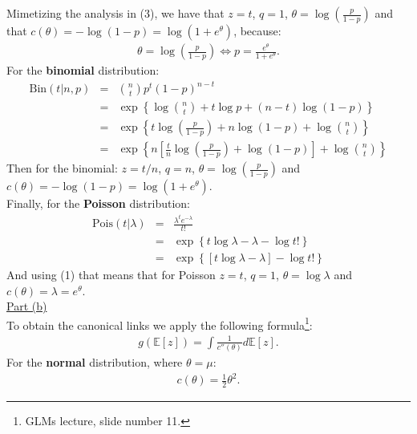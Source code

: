 \documentclass[a4paper, 11pt]{article}
\begin{document}
Mimetizing the analysis in (3), we have that $z=t$, $q=1$, $\theta = \log \left( \frac{p}{1-p} \right)$ and that $c(\theta) = -\log{(1-p)} = \log(1 + e^\theta)$, because:
\begin{eqnarray}
\theta = \log \left( \frac{p}{1-p} \right) \Leftrightarrow p = \frac{e^\theta}{1 + e^\theta}.
\end{eqnarray}
For the \textbf{binomial} distribution:
\begin{eqnarray}
\text{Bin}(t | n,p) &=& {n \choose t} p^t (1-p)^{n-t}   \nonumber \\
&=& \exp \left\{ \log{n \choose t} + t \log p + (n-t) \log{(1-p)} \right\} \nonumber \\
&=& \exp \left\{ t \log \left( \frac{p}{1-p} \right) + n \log{(1-p)} + \log{n \choose t} \right\} \nonumber \\
&=& \exp \left\{ n \left[ \frac{t}{n} \log\left( \frac{p}{1-p} \right) + \log{(1-p)} \right] + \log{n \choose t} \right\} \nonumber
\end{eqnarray}
Then for the binomial: $z = t/n$, $q=n$, $\theta = \log \left( \frac{p}{1-p} \right)$ and $c(\theta) = -\log{(1-p)} = \log(1 + e^\theta)$.\\
\newline Finally, for the \textbf{Poisson} distribution:
\begin{eqnarray}
\text{Pois}(t | \lambda) &=& \frac{\lambda^t e^{-\lambda}}{t!} \nonumber \\
&=& \exp \left\{ t \log \lambda - \lambda - \log t! \right\} \nonumber \\
&=& \exp \left\{ [t \log \lambda - \lambda] - \log t! \right\} \nonumber
\end{eqnarray}
And using (1) that means that for Poisson $z=t$, $q = 1$, $\theta = \log \lambda$ and $c(\theta) =\lambda = e^\theta$.\\
\newline \underline{Part (b)}\\
\newline To obtain the canonical links we apply the following formula\footnote{GLMs lecture, slide number 11.}:
\begin{eqnarray}
g(\mathbb{E}[z]) = \int \frac{1}{c''(\theta)} d\mathbb{E}[z]. \nonumber
\end{eqnarray}
For the \textbf{normal} distribution, where $\theta = \mu$:
\begin{eqnarray}
c(\theta) = \frac{1}{2} \theta^2. \nonumber
\end{eqnarray}
\end{document}
